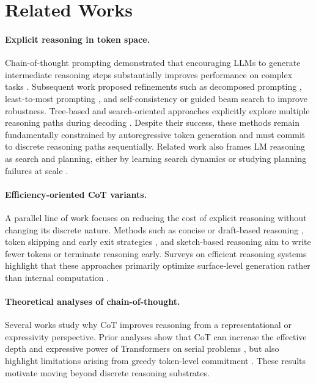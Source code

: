 \section{Related Works}

\paragraph{Explicit reasoning in token space.}
Chain-of-thought prompting demonstrated that encouraging LLMs to generate intermediate reasoning steps substantially improves performance on complex tasks \cite{wei2022chain}. Subsequent work proposed refinements such as decomposed prompting \cite{khot2022decomposed}, least-to-most prompting \cite{zhou2022least}, and self-consistency or guided beam search \cite{xie2023self} to improve robustness. Tree-based and search-oriented approaches explicitly explore multiple reasoning paths during decoding \cite{yao2023tree}. Despite their success, these methods remain fundamentally constrained by autoregressive token generation and must commit to discrete reasoning paths sequentially. Related work also frames LM reasoning as search and planning, either by learning search dynamics or studying planning failures at scale \cite{gandhi2024stream,lehnert2024beyond,hao2023reasoning}.

\paragraph{Efficiency-oriented CoT variants.}
A parallel line of work focuses on reducing the cost of explicit reasoning without changing its discrete nature. Methods such as concise or draft-based reasoning \cite{xu2025chain,madaan2022text}, token skipping and early exit strategies \cite{xia2025tokenskip,yang2025dynamic}, and sketch-based reasoning \cite{aytes2025sketch} aim to write fewer tokens or terminate reasoning early. Surveys on efficient reasoning systems highlight that these approaches primarily optimize surface-level generation rather than internal computation \cite{feng2025efficient,sui2025stop}.

\paragraph{Theoretical analyses of chain-of-thought.}
Several works study why CoT improves reasoning from a representational or expressivity perspective. Prior analyses show that CoT can increase the effective depth and expressive power of Transformers on serial problems \cite{merrill2023expressive,li2024chain,feng2023towards}, but also highlight limitations arising from greedy token-level commitment \cite{saparov2022language}. These results motivate moving beyond discrete reasoning substrates.


